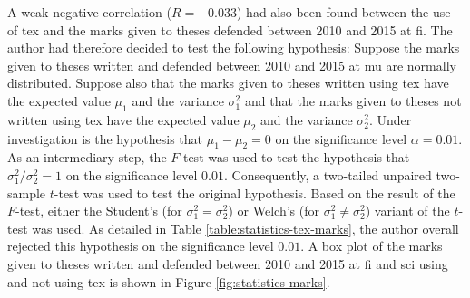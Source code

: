 A weak negative correlation ($R=-0.033$) had also been found between the use of \gls{tex} and the marks given to theses defended between 2010 and 2015 at \gls{fi}. The author had therefore decided to test the following \gls{hypothesis}: Suppose the marks given to theses written and defended between 2010 and 2015 at \gls{mu} are normally distributed. Suppose also that the marks given to theses written using \gls{tex} have the expected value $\mu_1$ and the variance $\sigma_1^2$ and that the marks given to theses not written using \gls{tex} have the expected value $\mu_2$ and the variance $\sigma_2^2$. Under investigation is the \gls{hypothesis} that $\mu_1-\mu_2=0$ on the significance level $\alpha=0.01$. As an intermediary step, the $F$-test was used to test the \gls{hypothesis} that $\sigma_1^2/\sigma_2^2=1$ on the significance level $0.01$. Consequently, a two-tailed unpaired two-sample $t$-test was used to test the original \gls{hypothesis}. Based on the result of the $F$-test, either the Student's (for $\sigma_1^2=\sigma_2^2$) or Welch's \cite{WELCH01011947} (for $\sigma_1^2\not=\sigma_2^2$) variant of the $t$-test was used. As detailed in Table \ref{table:statistics-tex-marks}, the author overall rejected this \gls{hypothesis} on the significance level $0.01$. A box plot of the marks given to theses written and defended between 2010 and 2015 at \gls{fi} and \gls{sci} using and not using \gls{tex} is shown in Figure \ref{fig:statistics-marks}.
